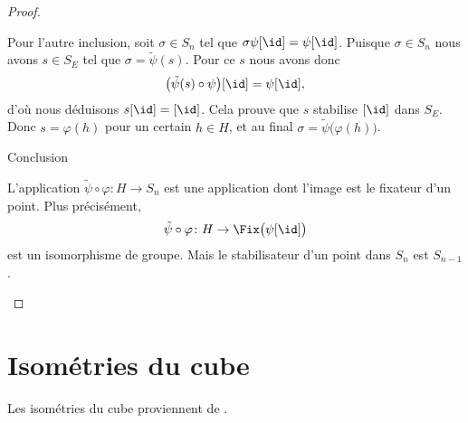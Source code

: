 \begin{proof}
\begin{subproof}
\begin{subproof}
			Pour l'autre inclusion, soit \( \sigma\in S_n\) tel que \( \sigma\psi[\id]=\psi[\id]\). Puisque \( \sigma\in S_n\) nous avons \( s\in S_E\) tel que \( \sigma=\tilde \psi(s)\). Pour ce \( s\) nous avons donc
			\begin{equation}
				\big( \tilde \psi(s)\circ\psi \big)[\id]=\psi[\id],
			\end{equation}
			d'où nous déduisons \( s[\id]=[\id]\). Cela prouve que \( s\) stabilise \( [\id]\) dans \( S_E\). Donc \( s=\varphi(h)\) pour un certain \( h\in H\), et au final \( \sigma=\tilde \psi\big( \varphi(h) \big)\).

			\item[Conclusion]

			L'application \( \tilde \psi\circ\varphi\colon H\to S_n\) est une application dont l'image est le fixateur d'un point. Plus précisément,
			\begin{equation}
				\tilde \psi\circ\varphi\colon H\to \Fix\big( \psi[\id] \big)
			\end{equation}
			est un isomorphisme de groupe. Mais le stabilisateur d'un point dans \( S_n\) est \( S_{n-1}\).
		\end{subproof}
	\end{subproof}
\end{proof}


\section{Isométries du cube}
\label{SecPVCmkxM}
Les isométries du cube proviennent de \cite{KXjFWKA}.

